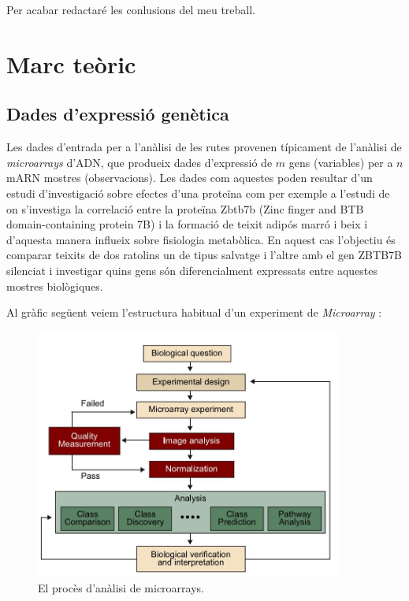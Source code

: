 Per acabar redactaré les conlusions del meu treball.
\chapter{Marc teòric}

\section{Dades d'expressió genètica}
Les dades d'entrada per a l'anàlisi de les rutes provenen típicament de l'anàlisi de \textit{microarrays} d'ADN, que produeix dades d'expressió de $m$ gens (variables) per a $n$ mARN mostres (observacions). Les dades com aquestes poden resultar d'un estudi d'investigació sobre efectes d'una proteïna com per exemple a l'estudi de \cite{li2017zbtb7b} on s'investiga la correlació entre la proteïna Zbtb7b (Zinc finger and BTB domain-containing protein 7B) i la formació de teixit adipós marró i beix i d'aquesta manera influeix sobre fisiologia metabòlica. En aquest cas l'objectiu és comparar teixits de dos ratolins un de tipus salvatge i l'altre amb el gen ZBTB7B silenciat i investigar quins gens són diferencialment expressats entre aquestes mostres biològiques. 

Al gràfic següent veiem l'estructura habitual d'un experiment de \textit{Microarray} \cite{plaPID00192743}:

\begin{figure}[H]
\centering
\includegraphics[width=0.9\textwidth]{figures/Pipeline_Microarray.jpg} 
\caption{El procès d'anàlisi de microarrays.}
\end{figure}

